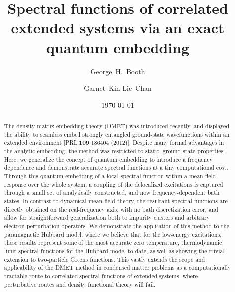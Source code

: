 \documentclass[aps,showpacs,twocolumn,nobibnotes]{revtex4}
\begin{document}
\title{Spectral functions of correlated extended systems via an exact quantum embedding}
\author{George~H.~Booth}
\author{Garnet~Kin-Lic~Chan}  

\begin{abstract}
The density matrix embedding theory (DMET) was introduced recently, and displayed the ability to seamless embed strongly entangled ground-state wavefunctions
within an extended environment [PRL {\bf 109} 186404 (2012)].
Despite many formal advantages in the analytic embedding, the method was restricted to static, ground-state properties.
Here, we generalize the concept of quantum embedding to introduce a frequency dependence and demonstrate accurate spectral functions at a tiny
computational cost. Through this quantum embedding of a local spectral function within a mean-field response over the whole system, 
a coupling of the delocalized excitations is captured through a small set of 
analytically constructed, and now frequency-dependent bath states. In contrast to dynamical mean-field theory, the resultant 
spectral functions are directly obtained on the real-frequency axis, with no bath discretization error, and allow for straightforward generalization both 
to impurity clusters and arbitrary electron perturbation operators. We demonstrate
the application of this method to the paramagnetic Hubbard model, where we believe that for the low-energy excitations, these results represent some of the most accurate 
zero temperature, thermodynamic limit spectral functions for the Hubbard model to date, as well as showing the trivial extension to two-particle Greens functions. 
This vastly extends the scope and applicability 
of the DMET method in condensed matter problems as a computationally tractable route to correlated spectral functions of extended systems, where perturbative routes and density functional theory will fail.
\end{abstract}
\date{\today}
\maketitle
\end{document}
